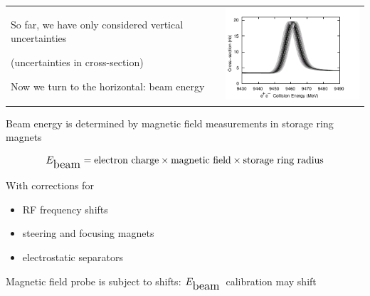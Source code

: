 \documentclass[landscape]{article}
\newcommand{\subs}[1]{{\mbox{\large #1}}}
\newcommand{\ebeam}{$E_\subs{beam}$}
\begin{document}
\begin{slide:energy}

\begin{center}
\begin{tabular}{p{0.6\linewidth} p{0.4\linewidth}}
\begin{minipage}{\linewidth}
So far, we have only considered vertical uncertainties

(uncertainties in cross-section)

\vspace{1 cm}
Now we turn to the horizontal: beam energy
\end{minipage} &
\begin{minipage}{\linewidth}
\includegraphics[width=\linewidth]{plots/energyuncertainty}
\end{minipage}
\end{tabular}
\end{center}

\vfill
Beam energy is determined by magnetic field measurements in storage ring magnets

\vfill
\[ E_\subs{beam} = \mbox{electron charge} \times \mbox{magnetic field} \times \mbox{storage ring radius} \]

\vfill
With corrections for

\vfill
\begin{center}
\begin{minipage}{0.95\linewidth}
\begin{itemize}

  \item RF frequency shifts

  \item steering and focusing magnets

  \item electrostatic separators

\end{itemize}
\end{minipage}
\end{center}

\vfill
Magnetic field probe is subject to shifts: \ebeam\ calibration may shift

\end{slide:energy}
\end{document}
